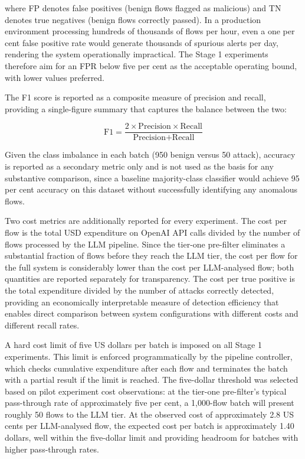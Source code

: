 \documentclass[../main.tex]{subfiles}
\begin{document}
\noindent where FP denotes false positives (benign flows flagged as malicious) and TN denotes true negatives (benign flows correctly passed). In a production environment processing hundreds of thousands of flows per hour, even a one per cent false positive rate would generate thousands of spurious alerts per day, rendering the system operationally impractical. The Stage 1 experiments therefore aim for an FPR below five per cent as the acceptable operating bound, with lower values preferred.

The F1 score is reported as a composite measure of precision and recall, providing a single-figure summary that captures the balance between the two:

\begin{equation}
\text{F1} = \frac{2 \times \text{Precision} \times \text{Recall}}{\text{Precision} + \text{Recall}}
\label{eq:f1}
\end{equation}

\noindent Given the class imbalance in each batch (950 benign versus 50 attack), accuracy is reported as a secondary metric only and is not used as the basis for any substantive comparison, since a baseline majority-class classifier would achieve 95 per cent accuracy on this dataset without successfully identifying any anomalous flows.

Two cost metrics are additionally reported for every experiment. The cost per flow is the total USD expenditure on OpenAI API calls divided by the number of flows processed by the LLM pipeline. Since the tier-one pre-filter eliminates a substantial fraction of flows before they reach the LLM tier, the cost per flow for the full system is considerably lower than the cost per LLM-analysed flow; both quantities are reported separately for transparency. The cost per true positive is the total expenditure divided by the number of attacks correctly detected, providing an economically interpretable measure of detection efficiency that enables direct comparison between system configurations with different costs and different recall rates.

A hard cost limit of five US dollars per batch is imposed on all Stage 1 experiments. This limit is enforced programmatically by the pipeline controller, which checks cumulative expenditure after each flow and terminates the batch with a partial result if the limit is reached. The five-dollar threshold was selected based on pilot experiment cost observations: at the tier-one pre-filter's typical pass-through rate of approximately five per cent, a 1,000-flow batch will present roughly 50 flows to the LLM tier. At the observed cost of approximately 2.8 US cents per LLM-analysed flow, the expected cost per batch is approximately 1.40 dollars, well within the five-dollar limit and providing headroom for batches with higher pass-through rates.
\end{document}
